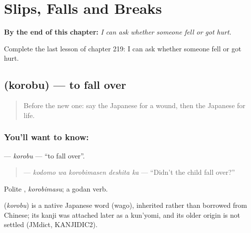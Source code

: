 
\chapter{Slips, Falls and Breaks}
\label{ch:ja-slips-falls-and-breaks}

\begin{chapteropening}
\textbf{By the end of this chapter:} \emph{I can ask whether someone fell or got hurt.}

Complete the last lesson of chapter 219: I can ask whether someone fell or got hurt.
\end{chapteropening}

\section[\texorpdfstring{\ja{ころぶ} (korobu)}{ころぶ (korobu)}]{ (korobu) — to fall over}

\label{lesson:JA-C219-korobu}



\begin{quote}
Before the new one: say the Japanese for a wound, then the Japanese for life.
\end{quote}

\subsection*{You'll want to know: }
\textbf{} — \emph{korobu} — \textquotedblleft{}to fall over\textquotedblright{}.

\begin{quote}
\textbf{ } — \emph{kodomo wa korobimasen deshita ka} — \textquotedblleft{}Didn't the child fall over?\textquotedblright{}
\end{quote}

Polite \textbf{}, \emph{korobimasu}; a godan verb.

\begin{cousinweb}
\textbf{} (\emph{korobu}) is a native Japanese word (wago), inherited rather than borrowed from Chinese; its kanji was attached later as a kun'yomi, and its older origin is not settled (JMdict, KANJIDIC2).
\end{cousinweb}

